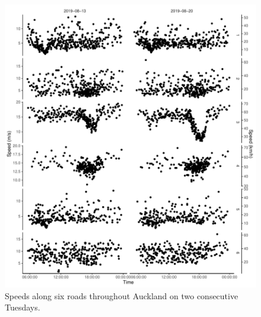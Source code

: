 \begin{knitrout}\small
{}\color{fgcolor}\begin{figure}

{\centering \includegraphics[width=.8\textwidth]{figure/nw_model_n2_segplots-1} 

}

\caption[Speeds along six roads throughout Auckland on two consecutive Tuesdays]{Speeds along six roads throughout Auckland on two consecutive Tuesdays.}\label{fig:nw_model_n2_segplots}
\end{figure}


\end{knitrout}

